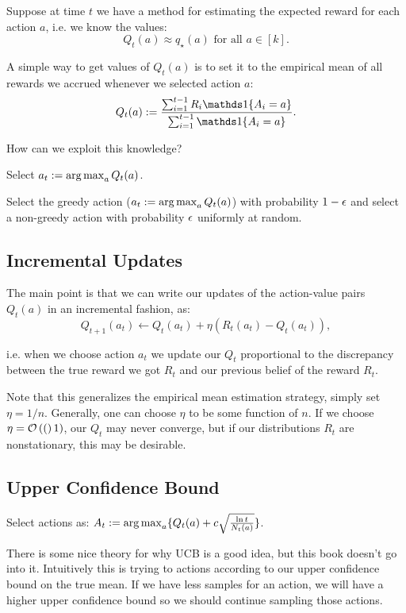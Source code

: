 \documentclass{article}
\begin{document}
Suppose at time $t$ we have a method for estimating the expected reward for each action $a$, i.e. we know the values:
\begin{equation}
    Q_t(a) \approx q_\star(a) \text{ for all } a\in[k].
\end{equation}

A simple way to get values of $Q_t(a)$ is to set it to the empirical mean of all rewards we accrued whenever we selected action $a$:
\begin{equation}
    Q_t(a) := \frac{\sum_{i=1}^{t-1} R_i \ind{A_i = a}}{\sum_{i=1}^{t-1} \ind{A_i = a}}.
\end{equation}

How can we exploit this knowledge? 
\begin{definition}[greedy]
    Select $a_t := \operatorname*{arg\,max}_a Q_t(a)$.
\end{definition}

\begin{definition}
    Select the greedy action ($a_t := \operatorname*{arg\,max}_a Q_t(a)$) with probability $1-\epsilon$ and select a non-greedy action with probability $\epsilon$ uniformly at random.
\end{definition}

\subsection{Incremental Updates}
The main point is that we can write our updates of the action-value pairs $Q_t(a)$ in an incremental fashion, as:
\begin{equation}
    Q_{t+1}(a_t) \leftarrow Q_{t}(a_t) + \eta (R_t(a_t) - Q_{t}(a_t)),
\end{equation}

i.e. when we choose action $a_t$ we update our $Q_t$ proportional to the discrepancy between the true reward we got $R_t$ and our previous belief of the reward $R_t$.

Note that this generalizes the empirical mean estimation strategy, simply set $\eta = 1/n$. Generally, one can choose $\eta$ to be some function of $n$. If we choose $\eta = \mathcal{O}\left((\right)1)$, our $Q_t$ may never converge, but if our distributions $R_t$ are nonstationary, this may be desirable.

\subsection{Upper Confidence Bound}
\begin{definition}
Select actions as: $A_t := \operatorname*{arg\,max}_a \{Q_t(a) + c \sqrt{\frac{\ln t}{N_t(a)}}\}$.
\end{definition}
There is some nice theory for why UCB is a good idea, but this book doesn't go into it. Intuitively this is trying to actions according to our upper confidence bound on the true mean. If we have less samples for an action, we will have a higher upper confidence bound so we should continue sampling those actions.
\end{document}
